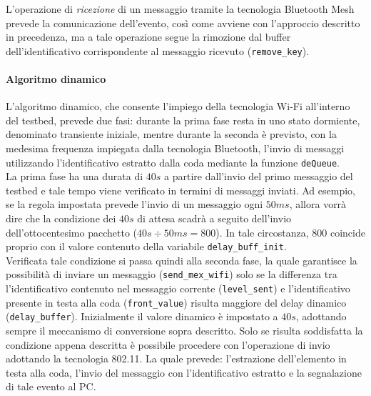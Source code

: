 \noindent L'operazione di \textit{ricezione} di un messaggio tramite la tecnologia Bluetooth Mesh prevede la comunicazione dell'evento, così come avviene con l'approccio descritto in precedenza, ma a tale operazione segue la rimozione dal buffer dell'identificativo corrispondente al messaggio ricevuto (\texttt{remove\_key}).

\paragraph{Algoritmo dinamico} 
L'algoritmo dinamico, che consente l'impiego della tecnologia Wi-Fi all'interno del testbed, prevede due fasi: durante la prima fase resta in uno stato dormiente, denominato transiente iniziale, mentre durante la seconda è previsto, con la medesima frequenza impiegata dalla tecnologia Bluetooth, l'invio di messaggi utilizzando l'identificativo estratto dalla coda mediante la funzione \texttt{deQueue}.\\
La prima fase ha una durata di $40 s$ a partire dall'invio del primo messaggio del testbed e tale tempo viene verificato in termini di messaggi inviati. Ad esempio, se la regola impostata prevede l'invio di un messaggio ogni $50 ms$, allora vorrà dire che la condizione dei $40 s$ di attesa scadrà a seguito dell'invio dell'ottocentesimo pacchetto ($40 s\div 50 ms = 800$). In tale circostanza, $800$ coincide proprio con il valore contenuto della variabile \texttt{delay\_buff\_init}.\\
Verificata tale condizione si passa quindi alla seconda fase, la quale garantisce la possibilità di inviare un messaggio (\texttt{send\_mex\_wifi}) solo se la differenza tra l'identificativo contenuto nel messaggio corrente (\texttt{level\_sent}) e l'identificativo presente in testa alla coda (\texttt{front\_value}) risulta maggiore del delay dinamico (\texttt{delay\_buffer}). Inizialmente il valore dinamico è impostato a $40 s$, adottando sempre il meccanismo di conversione sopra descritto. Solo se risulta soddisfatta la condizione appena descritta è possibile procedere con l'operazione di invio adottando la tecnologia 802.11. La quale prevede: l'estrazione dell'elemento in testa alla coda, l'invio del messaggio con l'identificativo estratto e la segnalazione di tale evento al PC.

